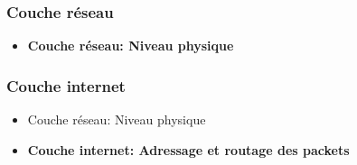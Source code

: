 \begin{frame}\frametitle{Couche réseau}

    \begin{itemize}
        \item \textbf{{\Large Couche réseau}: Niveau physique}
    \end{itemize}
     

\end{frame}


\begin{frame}\frametitle{Couche internet}

    \begin{itemize}
        \item {\Large Couche réseau}: Niveau physique
        \item \textbf{{\Large Couche internet}: Adressage et routage des packets}
    \end{itemize}


\end{frame}










